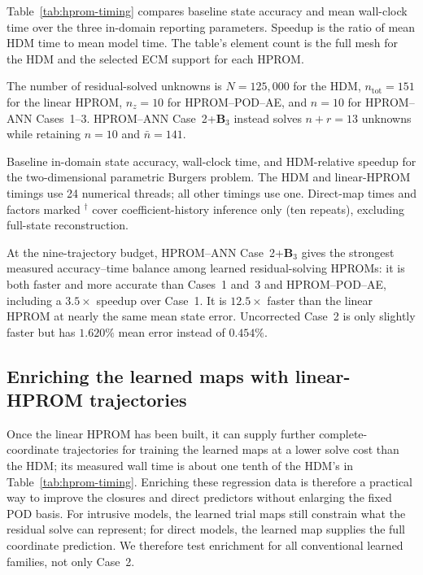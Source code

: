 \documentclass[11pt]{article}
\newcommand{\papertable}[1]{%
  \begingroup
  \small
  \setlength{\tabcolsep}{3.5pt}%
  \renewcommand{\arraystretch}{1.15}%
  \begin{adjustbox}{max width=\textwidth}
  
  \end{adjustbox}%
  \endgroup
}
\begin{document}
Table~\ref{tab:hprom-timing} compares baseline state accuracy and mean
wall-clock time over the three in-domain reporting parameters.  Speedup
is the ratio of mean HDM time to mean model time.  The table's element
count is the full mesh for the HDM and the selected ECM support for each
HPROM.

The number of residual-solved unknowns is $N=125{,}000$ for the HDM,
$n_{\mathrm{tot}}=151$ for the linear HPROM, $n_z=10$ for HPROM--POD--AE,
and $n=10$ for HPROM--ANN Cases~1--3.  HPROM--ANN Case~2+$\mathbf B_3$
instead solves $n+r=13$ unknowns while retaining $n=10$ and $\bar n=141$.
\begin{table}[H]
\centering
\caption{Baseline in-domain state accuracy, wall-clock time, and HDM-relative
speedup for the two-dimensional parametric Burgers problem.  The HDM and
linear-HPROM timings use 24 numerical threads; all other timings use one.
Direct-map times and factors marked $^\dagger$ cover coefficient-history
inference only (ten repeats), excluding full-state reconstruction.}
\label{tab:hprom-timing}
\papertable{tables/euclidean_hprom/timing_baseline.tex}
\end{table}
At the nine-trajectory budget, HPROM--ANN Case~2+$\mathbf B_3$ gives the
strongest measured accuracy--time balance among learned residual-solving
HPROMs: it is both faster and more accurate than Cases~1 and~3 and
HPROM--POD--AE, including a $3.5\times$ speedup over Case~1.  It is
$12.5\times$ faster than the linear HPROM at nearly the same mean state
error.  Uncorrected Case~2 is only slightly faster but has $1.620\%$
mean error instead of $0.454\%$.

\subsection{Enriching the learned maps with linear-HPROM trajectories}
\label{sec:hprom-enrichment}
Once the linear HPROM has been built, it can supply further complete-coordinate
trajectories for training the learned maps at a lower solve cost than the
HDM; its measured wall time is about one tenth of the HDM's in
Table~\ref{tab:hprom-timing}.  Enriching these regression data is therefore
a practical way to improve the closures and direct predictors without
enlarging the fixed POD basis.  For intrusive models, the learned trial
maps still constrain what the residual solve can represent; for direct
models, the learned map supplies the full coordinate prediction.  We
therefore test enrichment for all conventional learned families, not only
Case~2.
\end{document}
